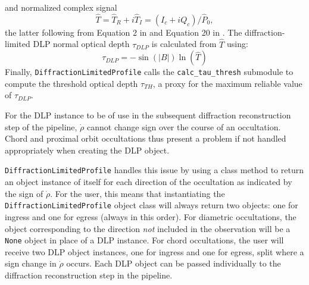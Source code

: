 \documentclass[titlepage, 12pt]{article}
\begin{document}
            and normalized complex signal
            \begin{equation}
                \hat{T}=\hat{T}_R+i\hat{T}_I=(I_c+iQ_c)/\hat{P}_0,
            \end{equation}
            the latter following from Equation 2 in \citet{Marouf1986} and
            Equation 20 in \citet{CRSUG2018}. The diffraction-limited
            DLP normal optical depth $\tau_{DLP}$ is calculated from $\hat{T}$  using:
            \begin{equation}
                \tau_{DLP}=-\sin(|B|)\ln(\hat{T})
            \end{equation}
            Finally, \texttt{DiffractionLimitedProfile} calls the
            \texttt{calc\_tau\_thresh} submodule to compute the threshold
            optical depth $\tau_{TH}$, a proxy for the maximum reliable value
            of $\tau_{DLP}$.
            \par\hfill\par
            For the DLP instance to be of use in the subsequent diffraction
            reconstruction step of the pipeline, $\dot{\rho}$ cannot change sign over the course of an occultation. Chord and proximal orbit occultations thus present a
            problem if not handled appropriately when creating the DLP
            object.
            \par\hfill\par
            \texttt{DiffractionLimitedProfile} handles this issue by
            using a class method to return an object instance of itself for each
            direction of the occultation as indicated by the sign of
            $\dot{\rho}$. For the user, this means that instantiating the
            \texttt{DiffractionLimitedProfile} object class will always return
            two objects: one for ingress and one for egress (always in this
            order). For diametric occultations, the object corresponding to
            the direction \textit{not} included in the observation will be a
            \texttt{None} object in place of a DLP instance. For chord
            occultations, the user will receive two DLP object instances, one
            for ingress and one for egress, split where a sign change in
            $\dot{\rho}$ occurs. Each DLP object can be passed individually
            to the diffraction reconstruction step in the pipeline.
            
\end{document}
